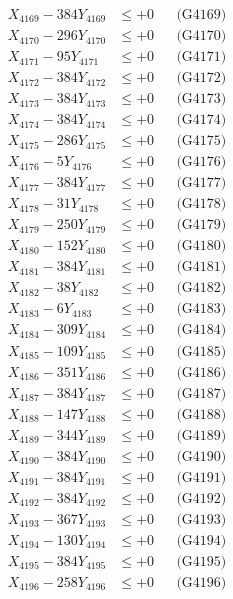 \documentclass[a4paper,10pt]{article}
\begin{document}
{\begin{align}
X_{4169} - 384Y_{4169} &\leq +0 && \text{(G4169)} \\
X_{4170} - 296Y_{4170} &\leq +0 && \text{(G4170)} \\
\allowbreak
X_{4171} - 95Y_{4171} &\leq +0 && \text{(G4171)} \\
X_{4172} - 384Y_{4172} &\leq +0 && \text{(G4172)} \\
X_{4173} - 384Y_{4173} &\leq +0 && \text{(G4173)} \\
X_{4174} - 384Y_{4174} &\leq +0 && \text{(G4174)} \\
X_{4175} - 286Y_{4175} &\leq +0 && \text{(G4175)} \\
X_{4176} - 5Y_{4176} &\leq +0 && \text{(G4176)} \\
X_{4177} - 384Y_{4177} &\leq +0 && \text{(G4177)} \\
X_{4178} - 31Y_{4178} &\leq +0 && \text{(G4178)} \\
X_{4179} - 250Y_{4179} &\leq +0 && \text{(G4179)} \\
X_{4180} - 152Y_{4180} &\leq +0 && \text{(G4180)} \\
\allowbreak
X_{4181} - 384Y_{4181} &\leq +0 && \text{(G4181)} \\
X_{4182} - 38Y_{4182} &\leq +0 && \text{(G4182)} \\
X_{4183} - 6Y_{4183} &\leq +0 && \text{(G4183)} \\
X_{4184} - 309Y_{4184} &\leq +0 && \text{(G4184)} \\
X_{4185} - 109Y_{4185} &\leq +0 && \text{(G4185)} \\
X_{4186} - 351Y_{4186} &\leq +0 && \text{(G4186)} \\
X_{4187} - 384Y_{4187} &\leq +0 && \text{(G4187)} \\
X_{4188} - 147Y_{4188} &\leq +0 && \text{(G4188)} \\
X_{4189} - 344Y_{4189} &\leq +0 && \text{(G4189)} \\
X_{4190} - 384Y_{4190} &\leq +0 && \text{(G4190)} \\
\allowbreak
X_{4191} - 384Y_{4191} &\leq +0 && \text{(G4191)} \\
X_{4192} - 384Y_{4192} &\leq +0 && \text{(G4192)} \\
X_{4193} - 367Y_{4193} &\leq +0 && \text{(G4193)} \\
X_{4194} - 130Y_{4194} &\leq +0 && \text{(G4194)} \\
X_{4195} - 384Y_{4195} &\leq +0 && \text{(G4195)} \\
X_{4196} - 258Y_{4196} &\leq +0 && \text{(G4196)} \\

\end{align}}
\end{document}
